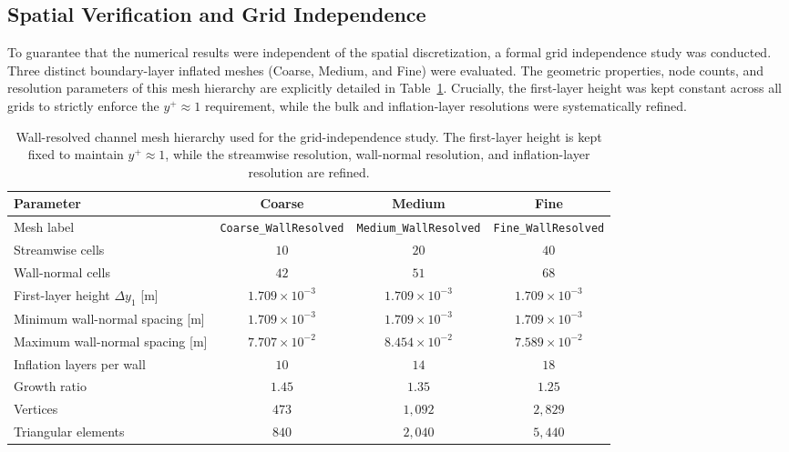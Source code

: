 \subsection{Spatial Verification and Grid Independence}
\label{subsec:app_channel_mesh}
To guarantee that the numerical results were independent of the spatial discretization, a formal grid independence study was conducted. Three distinct boundary-layer inflated meshes (Coarse, Medium, and Fine) were evaluated. The geometric properties, node counts, and resolution parameters of this mesh hierarchy are explicitly detailed in Table~\ref{tab:appendix_channel_meshes}. Crucially, the first-layer height was kept constant across all grids to strictly enforce the $y^+ \approx 1$ requirement, while the bulk and inflation-layer resolutions were systematically refined. 

\begin{table}[htbp]
	\centering
	\footnotesize
	\caption{Wall-resolved channel mesh hierarchy used for the grid-independence study. The first-layer height is kept fixed to maintain $y^+\approx1$, while the streamwise resolution, wall-normal resolution, and inflation-layer resolution are refined.}
	\label{tab:appendix_channel_meshes}
	\renewcommand{\arraystretch}{1.2}
	\begin{tabularx}{\textwidth}{lccc}
		\hline
		\textbf{Parameter} & \textbf{Coarse} & \textbf{Medium} & \textbf{Fine} \\
		\hline
		Mesh label & \texttt{Coarse\_WallResolved} & \texttt{Medium\_WallResolved} & \texttt{Fine\_WallResolved} \\
		Streamwise cells & $10$ & $20$ & $40$ \\
		Wall-normal cells & $42$ & $51$ & $68$ \\
		First-layer height $\Delta y_1$ [m] & $1.709 \times 10^{-3}$ & $1.709 \times 10^{-3}$ & $1.709 \times 10^{-3}$ \\
		Minimum wall-normal spacing [m] & $1.709 \times 10^{-3}$ & $1.709 \times 10^{-3}$ & $1.709 \times 10^{-3}$ \\
		Maximum wall-normal spacing [m] & $7.707 \times 10^{-2}$ & $8.454 \times 10^{-2}$ & $7.589 \times 10^{-2}$ \\
		Inflation layers per wall & $10$ & $14$ & $18$ \\
		Growth ratio & $1.45$ & $1.35$ & $1.25$ \\
		Vertices & $473$ & $1{,}092$ & $2{,}829$ \\
		Triangular elements & $840$ & $2{,}040$ & $5{,}440$ \\
		\hline
	\end{tabularx}
\end{table}

